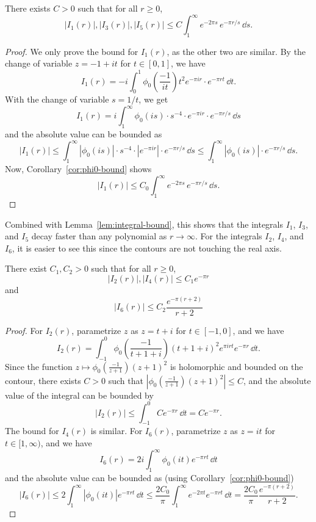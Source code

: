 \begin{lemma}\label{lem:bound-I1-I3-I5}
    There exists $C > 0$ such that for all $r \geq 0$,
    \begin{equation}
        |I_1(r)|, |I_3(r)|, |I_5(r)| \leq C \int_1^{\infty} e^{-2\pi s} \, e^{-\pi r / s} \, \dd s.
    \end{equation}
\end{lemma}
\begin{proof}
    We only prove the bound for $I_1(r)$, as the other two are similar.
    By the change of variable $z = -1 + i t$ for $t \in [0,1]$, we have
    $$
    I_1(r) = -i \int_0^1 \phi_0\left(\frac{-1}{i t}\right) t^2 e^{-\pi i r} \cdot e^{-\pi r t} \, \dd t.
    $$
    With the change of variable $s = 1 / t$, we get
    $$
    I_1(r) = i \int_1^{\infty} \phi_0(i s) \cdot s^{-4} \cdot e^{-\pi i r} \cdot e^{-\pi r / s} \, \dd s
    $$
    and the absolute value can be bounded as
    $$
    |I_1(r)| \leq \int_1^{\infty} |\phi_0(i s)| \cdot s^{-4} \cdot |e^{-\pi i r}| \cdot e^{-\pi r / s} \, \dd s \le \int_1^{\infty} |\phi_0(is)| \cdot e^{-\pi r / s} \, \dd s.
    $$
    Now, Corollary~\ref{cor:phi0-bound} shows
    $$
    |I_1(r)| \leq C_0 \int_1^{\infty} e^{-2\pi s} \, e^{-\pi r / s} \, \dd s.
    $$
\end{proof}
Combined with Lemma~\ref{lem:integral-bound}, this shows that the integrals $I_1$, $I_3$, and $I_5$ decay faster than any polynomial as $r \to \infty$.
For the integrals $I_2$, $I_4$, and $I_6$, it is easier to see this since the contours are not touching the real axis.
\begin{lemma}\label{lem:bound-I2-I4-I6}
    There exist $C_1, C_2 > 0$ such that for all $r \geq 0$,
    \begin{equation}
        |I_2(r)|, |I_4(r)| \leq C_1 e^{-\pi r}
    \end{equation}
    and
    \begin{equation}
        |I_6(r)| \leq C_2 \frac{e^{-\pi(r + 2)}}{r + 2}
    \end{equation}
\end{lemma}
\begin{proof}
    For $I_2(r)$, parametrize $z$ as $z = t + i$ for $t \in [-1,0]$, and we have
    $$
        I_2(r) = \int_{-1}^0 \phi_0\left(\frac{-1}{t + 1 + i}\right) (t + 1 + i)^2 e^{\pi i r t} e^{-\pi r} \, \dd t.
    $$
    Since the function $z \mapsto \phi_0\left(\frac{-1}{z+1}\right) (z+1)^2$ is holomorphic and bounded on the contour,
    there exists $C > 0$ such that $|\phi_0\left(\frac{-1}{z+1}\right) (z + 1)^2| \leq C$, and the absolute value of the integral can be bounded by
    $$
        |I_2(r)| \le \int_{-1}^{0} C e^{-\pi r} \, \dd t = C e^{-\pi r}.
    $$
    The bound for $I_4(r)$ is similar.
    For $I_6(r)$, parametrize $z$ as $z = i t$ for $t \in [1, \infty)$, and we have
    $$
        I_6(r) = 2 i \int_1^{\infty} \phi_0(i t) e^{-\pi r t} \, \dd t
    $$
    and the absolute value can be bounded as (using Corollary~\ref{cor:phi0-bound})
    $$
        |I_6(r)| \leq 2 \int_1^{\infty} |\phi_0(i t)| e^{-\pi r t} \, \dd t \leq \frac{2C_0}{\pi} \int_1^{\infty} e^{-2\pi t} e^{-\pi r t} \, \dd t = \frac{2C_0}{\pi} \frac{e^{-\pi (r + 2)}}{r + 2}.
    $$
\end{proof}


